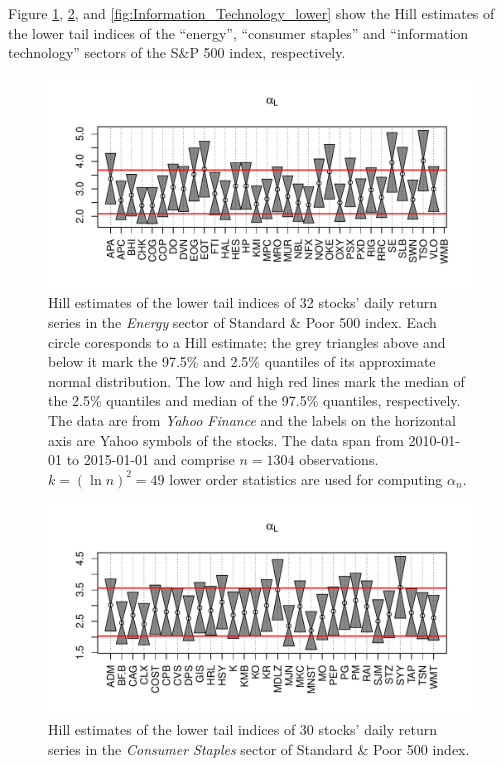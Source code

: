 \documentclass{article}
\newcommand{\1}[1]{
  \mathbf{1}_{\{#1\}}
}
\begin{document}
Figure \ref{fig:Energy_lower},
\ref{fig:Consumer_Staples_lower},
and \ref{fig:Information_Technology_lower}
show the Hill estimates of the
lower tail indices of the ``energy'', ``consumer staples'' and ``information
technology'' sectors of the S\&P 500 index, respectively.
\begin{figure}[htb!]
  \centering
  \includegraphics[width=\textwidth]{Energy_lower.pdf}
  \caption{Hill estimates of the lower tail indices of 32 stocks'
    daily return series in the {\it Energy} sector of Standard \& Poor
    500 index. Each circle coresponds to a Hill estimate; the grey
    triangles above and below it mark the 97.5\% and 2.5\% quantiles
    of its approximate normal distribution.
    The low and high red lines mark the median of the 2.5\% quantiles
    and median of the 97.5\% quantiles, respectively.
    The data are from {\it Yahoo Finance} and the labels on
    the horizontal axis are Yahoo symbols of the stocks. The data span
    from 2010-01-01 to 2015-01-01 and comprise $n=1304$
    observations. $k=(\ln n)^2 = 49$ lower order statistics are used
    for computing $\alpha_n$. 
  }
  \label{fig:Energy_lower}
\end{figure}

\begin{figure}[htb!]
  \centering
  \includegraphics[width=\textwidth]{Consumer_Staples_lower.pdf}
  \caption{Hill estimates of the lower tail indices of 30 stocks'
    daily return series in the {\it Consumer Staples} sector of
    Standard \& Poor 500 index.
  }
  \label{fig:Consumer_Staples_lower}
\end{figure}
\end{document}
